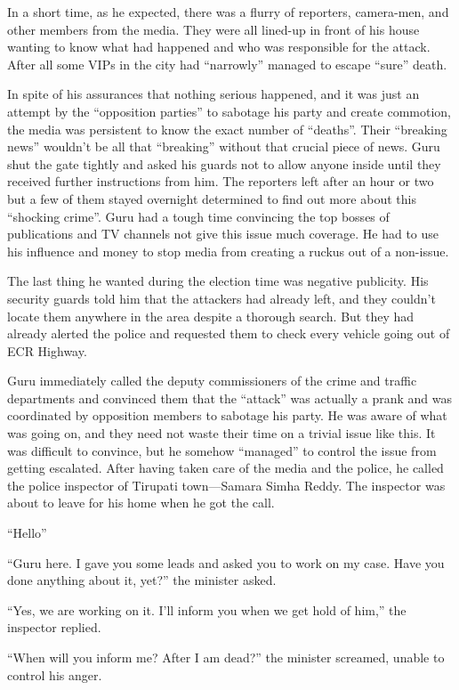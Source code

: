 In a short time, as he expected, there was a flurry of reporters, camera-men,
and other members from the media. They were all lined-up in front of his house
wanting to know what had happened and who was responsible for the attack. After
all some VIPs in the city had “narrowly” managed to escape “sure” death.

In spite of his assurances that nothing serious happened, and it was just an
attempt by the “opposition parties” to sabotage his party and create commotion,
the media was persistent to know the exact number of “deaths”. Their “breaking
news” wouldn't be all that “breaking” without that crucial piece of news. Guru
shut the gate tightly and asked his guards not to allow anyone inside until they
received further instructions from him. The reporters left after an hour or two
but a few of them stayed overnight determined to find out more about this
“shocking crime”. Guru had a tough time convincing the top bosses of
publications and TV channels not give this issue much coverage. He had to use
his influence and money to stop media from creating a ruckus out of a non-issue.

The last thing he wanted during the election time was negative publicity. His
security guards told him that the attackers had already left, and they couldn't
locate them anywhere in the area despite a thorough search. But they had already
alerted the police and requested them to check every vehicle going out of ECR
Highway.

Guru immediately called the deputy commissioners of the crime and
traffic departments and convinced them that the “attack” was actually a prank
and was coordinated by opposition members to sabotage his party. He was aware of
what was going on, and they need not waste their time on a trivial issue like
this. It was difficult to convince, but he somehow “managed” to control the
issue from getting escalated.  After having taken care of the media and the
police, he called the police inspector of Tirupati town—Samara Simha Reddy. The
inspector was about to leave for his home when he got the call.

“Hello”

“Guru here. I gave you some leads and asked you to work on my case. Have you
done anything about it, yet?” the minister asked.

“Yes, we are working on it. I'll inform you when we get hold of him,” the
inspector replied.

“When will you inform me? After I am dead?” the minister screamed, unable to
control his anger.

